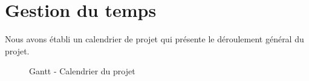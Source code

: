 \section{Gestion du temps}

Nous avons établi un calendrier de projet qui présente le déroulement général du projet.

\begin{figure}[!ht]
 \begin{center}
   \caption{\label{gantt} Gantt - Calendrier du projet}
 \end{center}  
\end{figure}
